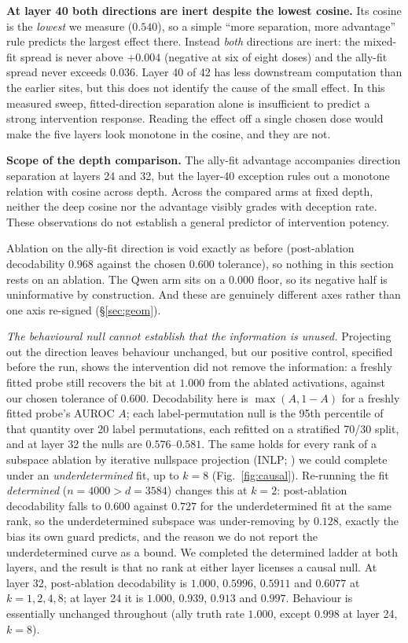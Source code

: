 \documentclass{article}
\begin{document}
\textbf{At layer 40 both directions are inert despite the lowest cosine.} Its cosine is the \emph{lowest} we
measure ($0.540$), so a simple ``more separation, more advantage'' rule predicts the largest effect there.
Instead \emph{both} directions are inert: the mixed-fit spread is never above $+0.004$ (negative at six of eight doses) and the
ally-fit spread never exceeds $0.036$. Layer 40 of 42 has less downstream computation than the earlier sites, but this does not identify the cause of the small effect. In this measured sweep, fitted-direction separation alone is insufficient to predict a strong intervention response. Reading the effect off a single chosen dose would make the five layers look monotone in the cosine,
and they are not.

\textbf{Scope of the depth comparison.} The ally-fit advantage accompanies direction separation at layers 24 and 32, but the layer-40 exception rules out a monotone relation with cosine across depth. Across the compared arms at fixed depth, neither the deep cosine nor the advantage visibly grades with deception rate. These observations do not establish a general predictor of intervention potency.

Ablation on the ally-fit direction is void exactly
as before (post-ablation
decodability $0.968$ against the chosen $0.600$ tolerance), so nothing in this section rests on an ablation. The Qwen arm sits on
a $0.000$ floor, so its negative half is uninformative by construction. And these are genuinely different
axes rather than one axis re-signed (\S\ref{sec:geom}).

\emph{The behavioural null cannot establish that the information is unused.} Projecting out the
direction leaves behaviour unchanged, but our positive control, specified before the run, shows the intervention
did not remove the information: a freshly fitted probe still recovers the bit at $1.000$ from the
ablated activations, against our chosen tolerance of $0.600$. Decodability here is $\max(A, 1-A)$ for a freshly fitted probe's AUROC $A$; each label-permutation null is the 95th percentile of that quantity over 20 label permutations, each refitted on a stratified 70/30 split, and at layer 32 the nulls are $0.576$--$0.581$. The same holds for every
rank of a subspace ablation by iterative nullspace projection (INLP; \citealp{ravfogel2020}) we could complete under an \emph{underdetermined} fit, up to $k{=}8$
(Fig.~\ref{fig:causal}). Re-running the fit \emph{determined} ($n{=}4000 > d{=}3584$) changes this at
$k{=}2$: post-ablation decodability falls to $0.600$ against $0.727$ for the underdetermined fit at the same
rank, so the underdetermined subspace was under-removing by $0.128$, exactly the bias its own guard predicts, and the reason we do not report the underdetermined curve as a bound. We completed
the determined ladder at both layers, and the result is that no rank at either layer licenses a causal
null. At layer 32, post-ablation decodability is $1.000$, $0.5996$, $0.5911$ and $0.6077$ at
$k = 1, 2, 4, 8$; at layer 24 it is $1.000$, $0.939$, $0.913$ and $0.997$. Behaviour is essentially unchanged
throughout (ally truth rate $1.000$, except $0.998$ at layer 24, $k{=}8$).
\end{document}
